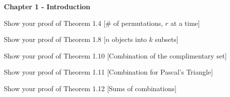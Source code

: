 \documentclass{exam}
\begin{document}
\begin{EnvFullwidth}
\Large \textbf{Chapter 1 - Introduction}
\end{EnvFullwidth}
\begin{questions}
\question
Show your proof of Theorem 1.4 [\# of permutations, \(r\) at a time]
\fillwithdottedlines{2in}

\question
Show your proof of Theorem 1.8 [\(n\) objects into \(k\) subsets]
\fillwithdottedlines{2in}

\question
Show your proof of Theorem 1.10 [Combination of the complimentary set]
\fillwithdottedlines{2in}

\question
Show your proof of Theorem 1.11 [Combination for Pascal's Triangle]
\fillwithdottedlines{2in}

\question
Show your proof of Theorem 1.12 [Sums of combinations]
\fillwithdottedlines{3in}

\end{questions}
\end{document}
